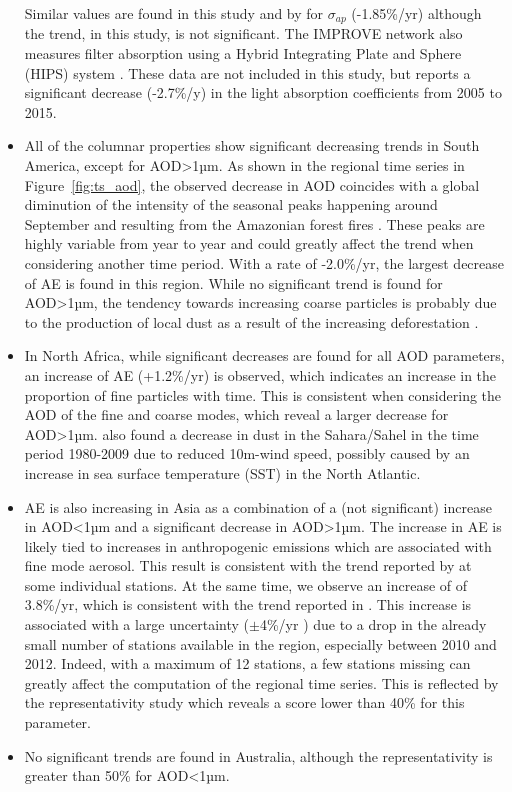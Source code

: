 \documentclass[acp, manuscript]{copernicus}
\begin{document}
\begin{itemize}
 Similar values are found in this study and by \cite{collaudcoen-2019} for $\sigma_{ap}$ (-1.85\%/yr) although the trend, in this study, is not significant. The IMPROVE network also measures filter absorption using a Hybrid Integrating Plate and Sphere (HIPS) system \citep{Warren2016}. These data are not included in this study, but \cite{Warren2016} reports a significant decrease (-2.7\%/y) in the light absorption coefficients from 2005 to 2015.
 \item All of the columnar properties show significant decreasing trends in South America, except for AOD>1µm. As shown in the regional time series in Figure~\ref{fig:ts_aod}, the observed decrease in AOD coincides with a global diminution of the intensity of the seasonal peaks happening around September and resulting from the Amazonian forest fires \citep{aragao201821st}. These peaks are highly variable from year to year and could greatly affect the trend when considering another time period. With a rate of -2.0\%/yr, the largest decrease of AE is found in this region. While no significant trend is found for AOD>1µm, the tendency towards increasing coarse particles is probably due to the production of local dust as a result of the increasing deforestation \citep{werth2002local,betts2008effects}.
 \item In North Africa, while significant decreases are found for all AOD parameters, an increase of AE (+1.2\%/yr) is observed, which indicates an increase in the proportion of fine particles with time. This is consistent when considering the AOD of the fine and coarse modes, which reveal a larger decrease for AOD>1µm. \cite{chin2014multi} also found a decrease in dust in the Sahara/Sahel in the time period 1980-2009 due to reduced 10m-wind speed, possibly caused by an increase in sea surface temperature (SST) in the North Atlantic.
 \item AE is also increasing in Asia as a combination of a (not significant) increase in AOD<1µm and a significant decrease in AOD>1µm. The increase in AE is likely tied to increases in anthropogenic emissions which are associated with fine mode aerosol. This result is consistent with the trend reported by \cite{yoon2012trend} at some individual stations. At the same time, we observe an increase of  of 3.8\%/yr, which is consistent with the trend reported in \cite{aas2019global}. This increase is associated with a large uncertainty ($\pm$4\%/yr ) due to a drop in the already small number of stations available in the region, especially between 2010 and 2012. Indeed, with a maximum of 12 stations, a few stations missing can greatly affect the computation of the regional time series. This is reflected by the representativity study which reveals a score lower than 40\% for this parameter. 
 \item No significant trends are found in Australia, although the representativity is greater than 50\% for AOD<1µm.

\end{itemize}
\end{document}
